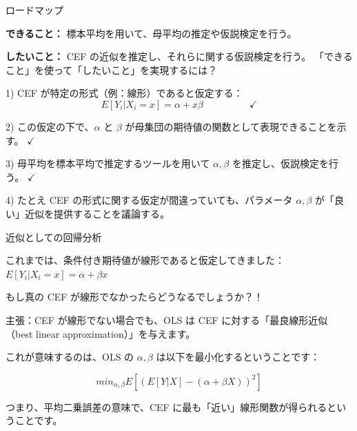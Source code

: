 \documentclass[11pt,handout]{beamer}
\newenvironment{wideitemize}{\itemize\addtolength{\itemsep}{10pt}}{\enditemize}
\begin{document}
\begin{frame}{ロードマップ}
	\begin{wideitemize}
		\item \textbf{できること：} 標本平均を用いて、母平均の推定や仮説検定を行う。
		\item \textbf{したいこと：} CEF の近似を推定し、それらに関する仮説検定を行う。
	\end{wideitemize}
	\bigskip
	「できること」を使って「したいこと」を実現するには？
	
	\begin{wideitemize}
		\item 1) CEF が特定の形式（例：線形）であると仮定する：
		$$E[Y_i | X_i = x] = \alpha + x \beta \hspace{2cm }\checkmark$$
		
		\item 2) この仮定の下で、$\alpha$ と $\beta$ が母集団の期待値の関数として表現できることを示す。 $\checkmark$
		
		\item
		3) 母平均を標本平均で推定するツールを用いて $\alpha, \beta$ を推定し、仮説検定を行う。 $\checkmark$
		
		\item
		4) たとえ CEF の形式に関する仮定が間違っていても、パラメータ $\alpha, \beta$ が「良い」近似を提供することを議論する。
	\end{wideitemize}
	
\end{frame}



\begin{frame}{近似としての回帰分析}
	\begin{wideitemize}
	\item
	これまでは、条件付き期待値が線形であると仮定してきました：$E[Y_i | X_i = x]  = \alpha + \beta x$
	
	\item
	もし真の CEF が線形でなかったらどうなるでしょうか？！
	
	\pause
	\item
	主張：CEF が線形でない場合でも、OLS は CEF に対する「最良線形近似（best linear approximation）」を与えます。
	\pause 
	\item
	これが意味するのは、OLS の $\alpha,\beta$ は以下を最小化するということです：
	 
	 $$min_{\alpha,\beta} E[ (E[Y|X]  - (\alpha + \beta X) )^2 ]$$
	 
	 \pause
	 つまり、平均二乗誤差の意味で、CEF に最も「近い」線形関数が得られるということです。
	\end{wideitemize}
\end{frame}
\end{document}
